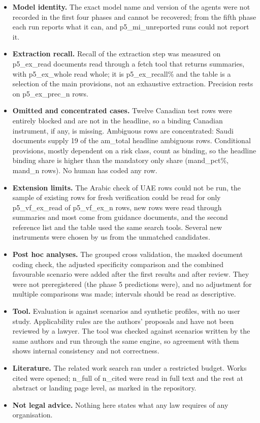 \documentclass[conference]{IEEEtran}
\begin{document}
\begin{itemize}
\item \textbf{Model identity.} The exact model name and version of the agents were not recorded in the first four phases and cannot be recovered; from the fifth phase each run reports what it can, and {{p5_mi_unreported}} runs could not report it.
\item \textbf{Extraction recall.} Recall of the extraction step was measured on {{p5_ex_read}} documents read through a fetch tool that returns summaries, with {{p5_ex_whole}} read whole; it is {{p5_ex_recall}}\% and the table is a selection of the main provisions, not an exhaustive extraction. Precision rests on {{p5_ex_prec_n}} rows.
\item \textbf{Omitted and concentrated cases.} Twelve Canadian test rows were entirely blocked and are not in the headline, so a binding Canadian instrument, if any, is missing. Ambiguous rows are concentrated: Saudi documents supply 19 of the {{am_total}} headline ambiguous rows. Conditional provisions, mostly dependent on a risk class, count as binding, so the headline binding share is higher than the mandatory only share ({{mand_pct}}\%, {{mand_n}} rows). No human has coded any row.
\item \textbf{Extension limits.} The Arabic check of UAE rows could not be run, the sample of existing rows for fresh verification could be read for only {{p5_vf_ex_read}} of {{p5_vf_ex_n}} rows, new rows were read through summaries and most come from guidance documents, and the second reference list and the table used the same search tools. Several new instruments were chosen by us from the unmatched candidates.
\item \textbf{Post hoc analyses.} The grouped cross validation, the masked document coding check, the adjusted specificity comparison and the combined favourable scenario were added after the first results and after review. They were not preregistered (the phase 5 predictions were), and no adjustment for multiple comparisons was made; intervals should be read as descriptive.
\item \textbf{Tool.} Evaluation is against scenarios and synthetic profiles, with no user study. Applicability rules are the authors' proposals and have not been reviewed by a lawyer. The tool was checked against scenarios written by the same authors and run through the same engine, so agreement with them shows internal consistency and not correctness.
\item \textbf{Literature.} The related work search ran under a restricted budget. Works cited were opened; {{n_full}} of {{n_cited}} were read in full text and the rest at abstract or landing page level, as marked in the repository.
\item \textbf{Not legal advice.} Nothing here states what any law requires of any organisation.
\end{itemize}
\end{document}
